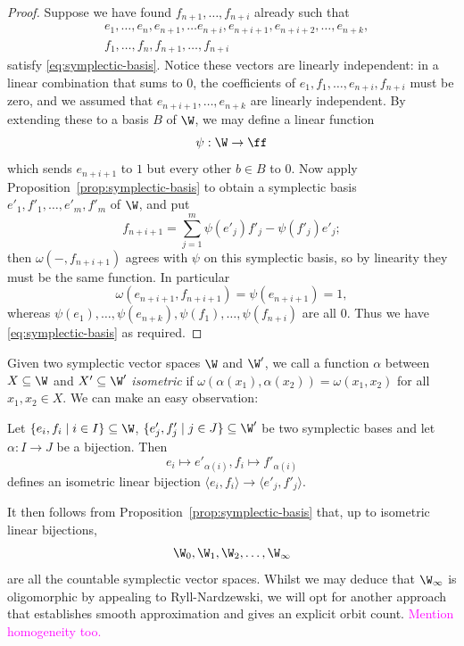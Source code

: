 \begin{proof}
    Suppose we have found $f_{n+1}, \ldots, f_{n+i}$ already such that
    \begin{align*}
        &e_1, \ldots, e_n, e_{n+1}, \ldots e_{n+i}, e_{n+i+1}, e_{n+i+2}, \ldots, e_{n+k},\\ 
        &f_1, \ldots, f_n, f_{n+1}, \ldots, f_{n+i}
    \end{align*}
    satisfy \eqref{eq:symplectic-basis}.
    Notice these vectors are linearly independent:
    in a linear combination that sums to $0$,
    the coefficients of $e_1, f_1, \dots, e_{n+i}, f_{n+i}$ must be zero,
    and we assumed that $e_{n+i+1}, \dots, e_{n+k}$ are linearly independent.
    By extending these to a basis $B$ of $\W$, we may define a linear function 
    \[
        \psi : \W \to \ff
    \]
    which sends $e_{n+i+1}$ to $1$ but every other $b \in B$ to $0$.
    Now apply Proposition~\ref{prop:symplectic-basis} to obtain a symplectic basis $e'_1, f'_1, \dots, e'_m, f'_m$ of $\W$, and put
    \[
        f_{n+i+1} = \sum_{j=1}^m \psi(e'_j) f'_j - \psi(f'_j) e'_j;
    \]
    then $\omega(-, f_{n+i+1})$ agrees with $\psi$ on this symplectic basis, so by linearity they must be the same function.
    In particular 
    \[
        \omega(e_{n+i+1}, f_{n+i+1}) = \psi(e_{n+i+1}) = 1,
    \]
    whereas $\psi(e_1), \dots, \psi(e_{n+k}), \psi(f_1), \dots, \psi(f_{n+i})$ are all $0$.
    Thus we have \eqref{eq:symplectic-basis} as required.
\end{proof}

Given two symplectic vector spaces $\W$ and $\W'$,
we call a function $\alpha$ between $X \subseteq \W$ and $X' \subseteq \W'$ \emph{isometric} if 
$\omega(\alpha(x_1), \alpha(x_2)) = \omega(x_1, x_2)$ for all $x_1, x_2 \in X$.
We can make an easy observation:
\begin{lemma}\label{lem:symplectic-basis-gives-isometry}
Let $\{e_i, f_i \mid i \in I\} \subseteq \W$, $\{e'_j, f'_j \mid j \in J\} \subseteq \W'$ be two symplectic bases
and let $\alpha : I \to J$ be a bijection.
Then 
\[
    e_i \mapsto e'_{\alpha(i)}, f_i \mapsto f'_{\alpha(i)}
\]
defines an isometric linear bijection $\langle e_i, f_i \rangle \to \langle e'_j, f'_j \rangle$.
\end{lemma}

It then follows from Proposition~\ref{prop:symplectic-basis} that, 
up to isometric linear bijections, 
\[\W_0, \W_1, \W_2, \ldots, \W_\infty\] are all the countable symplectic vector spaces.
Whilst we may deduce that $\W_\infty$ is oligomorphic by appealing to Ryll-Nardzewski,
we will opt for another approach that establishes smooth approximation and gives an explicit orbit count.
\textcolor{magenta}{Mention homogeneity too.}

